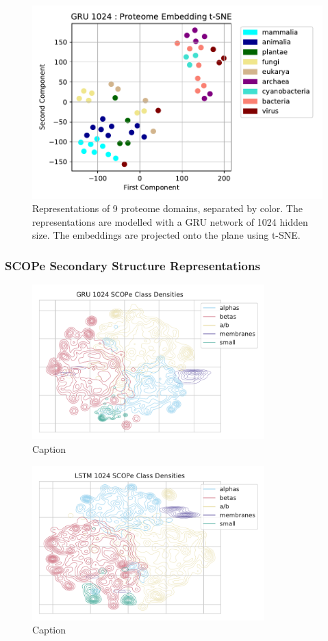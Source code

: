 \documentclass[a4paper,12pt]{article}
\begin{document}
\begin{figure}[H]
    \centering
    \includegraphics[width=0.8\linewidth]{figures/fig2b_GRU_1024_no_trunc.pdf}
    \caption{Representations of 9 proteome domains, separated by color. The representations are modelled with a GRU network of 1024 hidden size. The embeddings are projected onto the plane using t-SNE.}
    \label{fig:fig2b_GRU}
\end{figure}

\subsubsection{SCOPe Secondary Structure Representations}

\begin{figure}[H]
    \centering
    \includegraphics[width=0.8\textwidth]{figures/fig2c_GRU_1024_no_trunc.pdf}
    \caption{Caption}
    \label{fig:fig2c_GRU}
\end{figure}

\begin{figure}[H]
    \centering
    \includegraphics[width=0.8\textwidth]{figures/fig2c_LSTM_1024_no_trunc.pdf}
    \caption{Caption}
    \label{fig:fig2c_LSTM}
\end{figure}
\end{document}
